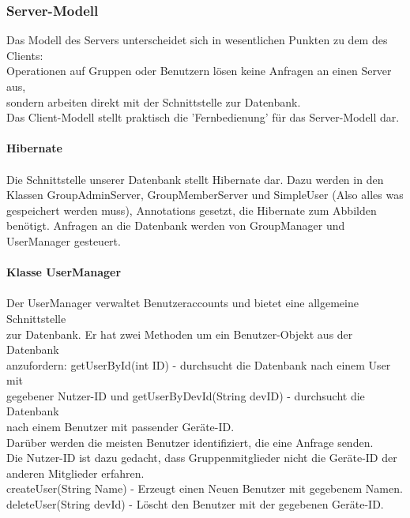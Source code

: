 \subsubsection{Server-Modell}
Das Modell des Servers unterscheidet sich in wesentlichen Punkten zu dem des Clients:\\
Operationen auf Gruppen oder Benutzern lösen keine Anfragen an einen Server aus,\\
sondern arbeiten direkt mit der Schnittstelle zur Datenbank.\\
Das Client-Modell stellt praktisch die 'Fernbedienung' für das Server-Modell dar.\\
\\
\textbf{Hibernate}\\
\\
Die Schnittstelle unserer Datenbank stellt Hibernate dar. Dazu werden in den Klassen
GroupAdminServer, GroupMemberServer und SimpleUser (Also alles was gespeichert werden muss), Annotations gesetzt, die Hibernate zum Abbilden benötigt.
Anfragen an die Datenbank werden von GroupManager und UserManager gesteuert.\\
\\
\textbf{Klasse UserManager}\\
\\
Der UserManager verwaltet Benutzeraccounts und bietet eine allgemeine Schnittstelle\\
zur Datenbank. Er hat zwei Methoden um ein Benutzer-Objekt aus der Datenbank\\
anzufordern: getUserById(int ID) - durchsucht die Datenbank nach einem User mit\\
gegebener Nutzer-ID und getUserByDevId(String devID) - durchsucht die Datenbank\\
nach einem Benutzer mit passender Geräte-ID. \\
Darüber werden die meisten Benutzer identifiziert, die eine Anfrage senden.\\
Die Nutzer-ID ist dazu gedacht, dass Gruppenmitglieder nicht die Geräte-ID der \\
anderen Mitglieder erfahren.\\
createUser(String Name) - Erzeugt einen Neuen Benutzer mit gegebenem Namen.\\
deleteUser(String devId) - Löscht den Benutzer mit der gegebenen Geräte-ID.\\
\\ \\ \\

